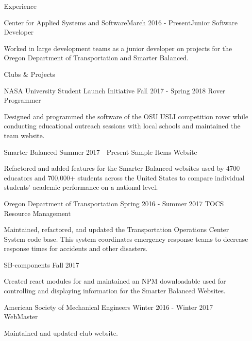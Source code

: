 \documentclass{resume} %
\begin{document}
\begin{rSection}{Experience}

  \begin{rSubsection}{Center for Applied Systems and Software}{March 2016 - Present}{Junior Software Developer}{}
  \item Worked in large development teams as a junior developer on projects for the Oregon  Department of Transportation and Smarter Balanced.
  \end{rSubsection}

\end{rSection}


\begin{rSection}{Clubs \& Projects}
  
    
  \begin{rSubsection} {NASA University Student Launch Initiative} {Fall 2017 - Spring 2018} {Rover Programmer} {}
  \item Designed and programmed the software of the OSU USLI competition rover while conducting educational outreach sessions with local schools and maintained the team website.
  \end{rSubsection}

  \begin{rSubsection} {Smarter Balanced} {Summer 2017 - Present} {Sample Items Website} {}
  \item Refactored and added features for the Smarter Balanced websites used by 4700 educators and 700,000+ students across the United States to compare individual students' academic performance on a national level.
  \end{rSubsection}

  \begin{rSubsection} {Oregon Department of Transportation} {Spring 2016 - Summer 2017} {TOCS Resource Management} {}
  \item Maintained, refactored, and updated the Transportation Operations Center System code base. This system coordinates emergency response teams to decrease response times for accidents and other disasters.
  \end{rSubsection}

  \begin{rSubsection} {SB-components} {Fall 2017} {} {}
  \item Created react modules for and maintained an NPM downloadable used for controlling and displaying information for the Smarter Balanced Websites.
  \end{rSubsection}

  \begin{rSubsection} {American Society of Mechanical Engineers} {Winter 2016 - Winter 2017} {WebMaster} {}
  \item Maintained and updated club website.
  \end{rSubsection}

\end{rSection}
\end{document}

